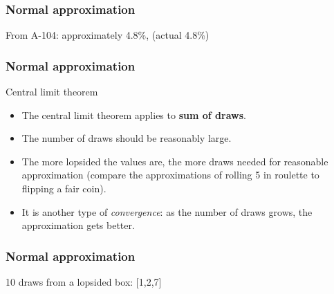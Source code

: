 \documentclass[handout]{beamer}
\begin{document}
   \begin{frame}
   \frametitle{Normal approximation}
   \begin{center}
   \end{center}
   From A-104: approximately 4.8\%, (actual 4.8\%)
   \end{frame}


   \begin{frame} \frametitle{Normal approximation}

   \begin{block}
   {Central limit theorem}
   \begin{itemize}
   \item The central limit theorem applies to {\bf sum of draws}.
   \item The number of draws should be reasonably large.
   \item The more lopsided the values are, the more draws needed for
   reasonable approximation (compare the approximations of rolling {\color{red} 5} in roulette
   to flipping a fair coin).
   \item It is another type of {\em convergence}: as the number
   of draws grows, the approximation gets better.
   \end{itemize}
   \end{block}
   \end{frame}



   \begin{frame}
   \frametitle{Normal approximation}
   \begin{center}
   \end{center}
   10 draws from a lopsided box: [1,2,7]
   \end{frame}
\end{document}
